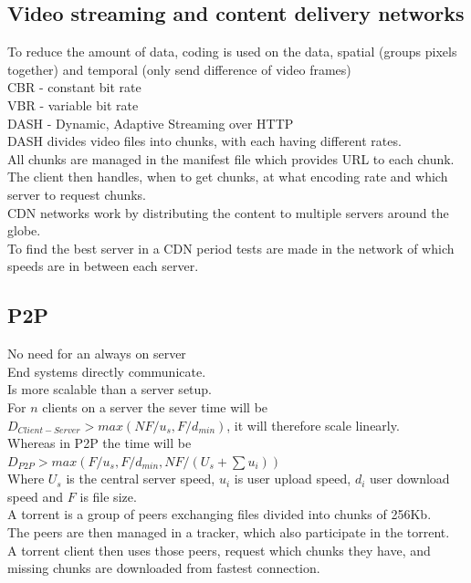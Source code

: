 \documentclass[12pt, a4paper]{article}
\begin{document}
		\subsection{Video streaming and content delivery networks}
			To reduce the amount of data, coding is used on the data, spatial (groups pixels together) and temporal (only send difference of video frames)\\
			CBR - constant bit rate\\
			VBR - variable bit rate\\
			DASH - Dynamic, Adaptive Streaming over HTTP\\
			DASH divides video files into chunks, with each having different rates.\\
			All chunks are managed in the manifest file which provides URL to each chunk.\\
			The client then handles, when to get chunks, at what encoding rate and which server to request chunks.\\
			CDN networks work by distributing the content to multiple servers around the globe.\\
			To find the best server in a CDN period tests are made in the network of which speeds are in between each server.\\
		\subsection{P2P}
			No need for an always on server\\
			End systems directly communicate.\\
			Is more scalable than a server setup.\\
			For $n$ clients on a server the sever time will be $D_{Client-Server}>max(NF/u_s,F/d_{min})$, it will therefore scale linearly.\\
			Whereas in P2P the time will be $D_{P2P}>max(F/u_s,F/d_{min},NF/(U_s+\sum u_i))$\\
			Where $U_s$ is the central server speed, $u_i$ is user upload speed, $d_i$ user download speed and $F$ is file size.\\
			A torrent is a group of peers exchanging files divided into chunks of 256Kb.\\
			The peers are then managed in a tracker, which also participate in the torrent.\\
			A torrent client then uses those peers, request which chunks they have, and missing chunks are downloaded from fastest connection.\\
\end{document}
